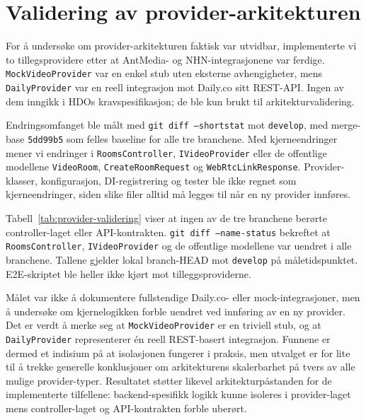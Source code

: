 \section{Validering av provider-arkitekturen}
\label{sec:provider-validering}

For å undersøke om provider-arkitekturen faktisk var utvidbar,
implementerte vi to tillegsprovidere etter at AntMedia- og
NHN-integrasjonene var ferdige. \texttt{MockVideoProvider} var en enkel
stub uten eksterne avhengigheter, mens \texttt{DailyProvider} var en
reell integrasjon mot Daily.co sitt REST-API. Ingen av dem inngikk i HDOs
kravspesifikasjon; de ble kun brukt til arkitekturvalidering.

Endringsomfanget ble målt med \texttt{git diff --shortstat} mot
\texttt{develop}, med merge-base \texttt{5dd99b5} som felles baseline
for alle tre branchene. Med kjerneendringer mener vi endringer i
\texttt{RoomsController}, \texttt{IVideoProvider} eller de offentlige
modellene \texttt{VideoRoom}, \texttt{CreateRoomRequest} og
\texttt{WebRtcLinkResponse}. Provider-klasser, konfigurasjon,
DI-registrering og tester ble ikke regnet som kjerneendringer, siden
slike filer alltid må legges til når en ny provider innføres.
\newpage


Tabell~\ref{tab:provider-validering} viser at ingen av de tre
branchene berørte controller-laget eller API-kontrakten.
\texttt{git diff --name-status} bekreftet at \texttt{RoomsController},
\texttt{IVideoProvider} og de offentlige modellene var uendret i alle
branchene. Tallene gjelder lokal branch-HEAD mot \texttt{develop} på
måletidspunktet. E2E-skriptet ble heller ikke kjørt mot tilleggsproviderne.



Målet var ikke å dokumentere fullstendige Daily.co- eller
mock-integrasjoner, men å undersøke om kjernelogikken forble uendret
ved innføring av en ny provider. Det er verdt å merke seg at
\texttt{MockVideoProvider} er en triviell stub, og at \texttt{DailyProvider}
representerer én reell REST-basert integrasjon. Funnene er dermed et
indisium på at isolasjonen fungerer i praksis, men utvalget er for lite
til å trekke generelle konklusjoner om arkitekturens skalerbarhet på
tvers av alle mulige provider-typer. Resultatet støtter likevel
arkitekturpåstanden for de implementerte tilfellene: backend-spesifikk
logikk kunne isoleres i provider-laget mens controller-laget og
API-kontrakten forble uberørt.
